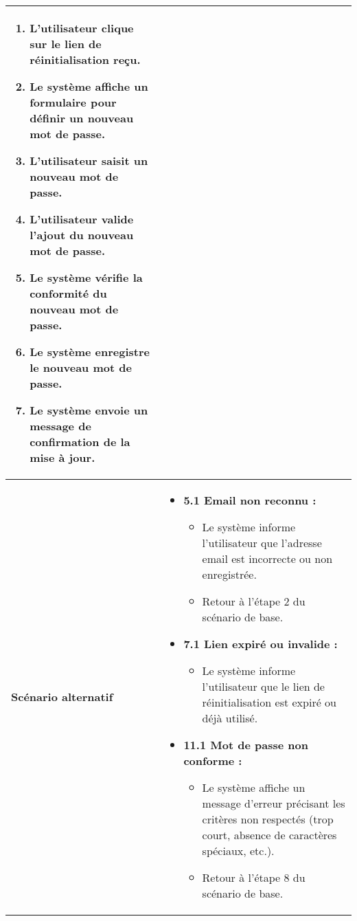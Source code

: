 \documentclass[a4paper,11pt]{report}
\begin{document}
\begin{table}[H]
\begin{tabularx}{\textwidth}{|l|X|}
\begin{enumerate}[leftmargin=*]
      \item L’utilisateur clique sur le lien de réinitialisation reçu.
      \item Le système affiche un formulaire pour définir un nouveau mot de passe.
      \item L’utilisateur saisit un nouveau mot de passe.
      \item L’utilisateur valide l’ajout du nouveau mot de passe.
      \item Le système vérifie la conformité du nouveau mot de passe.
      \item Le système enregistre le nouveau mot de passe.
      \item Le système envoie un message de confirmation de la mise à jour.
    \end{enumerate} \\ \hline
    \textbf{Scénario alternatif} &
    \begin{itemize}[leftmargin=*]
      \item \textbf{5.1 Email non reconnu :}
        \begin{itemize}[leftmargin=1em]
          \item Le système informe l’utilisateur que l’adresse email est incorrecte ou non enregistrée.
          \item Retour à l’étape 2 du scénario de base.
        \end{itemize}
      \item \textbf{7.1 Lien expiré ou invalide :}
        \begin{itemize}[leftmargin=1em]
          \item Le système informe l’utilisateur que le lien de réinitialisation est expiré ou déjà utilisé.
        \end{itemize}
      \item \textbf{11.1 Mot de passe non conforme :}
        \begin{itemize}[leftmargin=1em]
          \item Le système affiche un message d’erreur précisant les critères non respectés (trop court, absence de caractères spéciaux, etc.).
          \item Retour à l’étape 8 du scénario de base.
        \end{itemize}
    \end{itemize} \\ \hline
  \end{tabularx}
\end{table}
\end{document}

